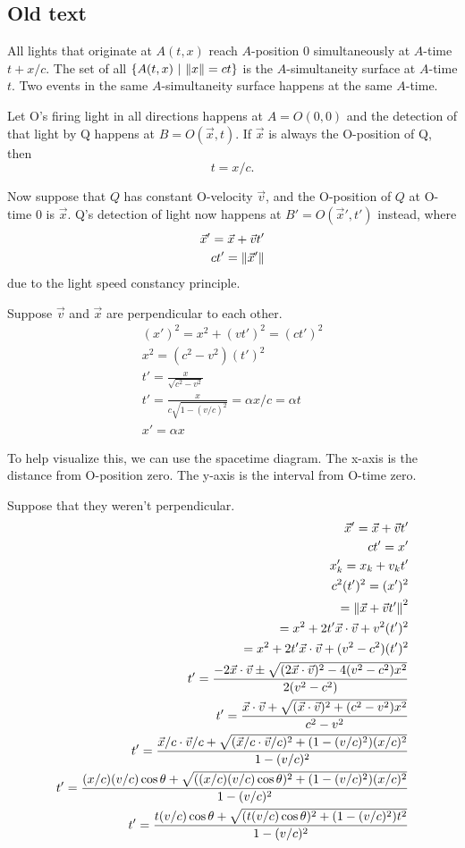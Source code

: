 \subsection{Old text}

All lights that originate at \(A(t,x)\) reach \(A\)-position 0 simultaneously at \(A\)-time \(t + x/c\).
The set of all $\{ A(t,x) ~|~ \norm{x} = ct \}$ is the \(A\)-simultaneity surface at \(A\)-time $t$.
Two events in the same \(A\)-simultaneity surface happens at the same \(A\)-time.

Let O's firing light in all directions happens at $A=O(0,0)$
and the detection of that light by Q happens at $B = O(\vec{x},t)$.
If $\vec{x}$ is always the O-position of Q,
then
\[
t = x/c.
\]

Now suppose that $Q$ has constant O-velocity $\vec{v}$,
and the O-position of $Q$ at O-time 0 is $\vec{x}$.
Q's detection of light now happens at $B'=O(\vec{x}',t')$ instead, where
\begin{align*}
\vec{x}' = \vec{x} + \vec{v} t'
\\ c t' = \norm{\vec{x}'}
\end{align*}
due to the light speed constancy principle.

Suppose $\vec{v}$ and $\vec{x}$ are perpendicular to each other.
\begin{align*}
(x')^2 = x^2 + (vt')^2 = (ct')^2
\\ x^2 = (c^2-v^2)(t')^2
\\ t' = \frac{x}{\sqrt{c^2-v^2}}
\\ t' = \frac{x}{c \sqrt{1-(v/c)^2}} = \alpha x/c = \alpha t
\\ x' = \alpha x
\end{align*}

To help visualize this, we can use the spacetime diagram.
The x-axis is the distance from O-position zero.
The y-axis is the interval from O-time zero.

Suppose that they weren't perpendicular.
\begin{align*}
\vec{x}' = \vec{x} + \vec{v} t'
\\ c t' = x'
\\ x_k' = x_k + v_k t'
\\ c^2 (t')^2 = (x')^2
\\ = \norm{\vec{x} + \vec{v} t'}^2
\\ = x^2 + 2 t' \vec{x} \cdot \vec{v} + v^2(t')^2
\\ = x^2 + 2 t' \vec{x} \cdot \vec{v} + (v^2 - c^2)(t')^2
\\ t' = \frac{- 2 \vec{x} \cdot \vec{v} \pm \sqrt{(2 \vec{x}\cdot\vec{v})^2 - 4 (v^2 - c^2) x^2}}{2 (v^2 - c^2)}
\\ t' = \frac{\vec{x}\cdot\vec{v} + \sqrt{(\vec{x}\cdot\vec{v})^2 + (c^2 - v^2) x^2}}{c^2 - v^2}
\\ t' = \frac{\vec{x}/c\cdot\vec{v}/c + \sqrt{(\vec{x}/c\cdot\vec{v}/c)^2 + (1 - (v/c)^2) (x/c)^2}}{1 - (v/c)^2}
\\ t' = \frac{(x/c)(v/c) \cos \theta + \sqrt{((x/c)(v/c)\cos\theta)^2 + (1 - (v/c)^2) (x/c)^2}}{1 - (v/c)^2}
\\ t' = \frac{t(v/c) \cos \theta + \sqrt{(t(v/c)\cos\theta)^2 + (1 - (v/c)^2) t^2}}{1 - (v/c)^2}
\end{align*}

